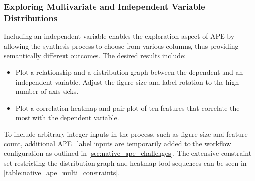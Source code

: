 \subsubsection{Exploring Multivariate and Independent Variable Distributions}\label{sec:native_ape_multi}

Including an independent variable enables the exploration aspect of APE by allowing the synthesis process to choose from various columns, thus providing semantically different outcomes. The desired results include:
\begin{itemize}
    \item Plot a relationship and a distribution graph between the dependent and an independent variable. Adjust the figure size and label rotation to the high number of axis ticks.
    \item Plot a correlation heatmap and pair plot of ten features that correlate the most with the dependent variable.
\end{itemize}
To include arbitrary integer inputs in the process, such as figure size and feature count, additional APE\_label inputs are temporarily added to the workflow configuration as outlined in \autoref{sec:native_ape_challenges}. The extensive constraint set restricting the distribution graph and heatmap tool sequences can be seen in \autoref{table:native_ape_multi_constraints}.
